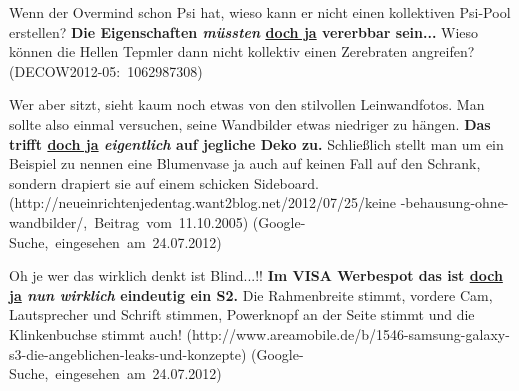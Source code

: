 \begin{exe}
	\ex\label{389}
	\scriptsize
	Wenn der Overmind schon Psi hat, wieso kann er nicht einen kollektiven Psi-Pool erstellen? \textbf{Die Eigenschaften \textit{müssten} \underline{doch 		ja} vererbbar sein...} Wieso können die Hellen Tepmler dann nicht kollektiv einen Zerebraten angreifen?                                               
	\hfill\hbox{(DECOW2012-05: 1062987308)}	
\end{exe}
	
\begin{exe}
	\ex\label{390}
	\scriptsize
	Wer aber sitzt, sieht kaum noch etwas von den stilvollen Leinwandfotos. Man sollte also einmal versuchen, seine Wandbilder etwas niedriger zu hängen. 		\textbf{Das trifft \underline{doch ja} \textit{eigentlich} auf jegliche Deko zu.} Schließlich stellt man um ein Beispiel zu nennen eine Blumenvase ja 		auch auf keinen Fall auf den Schrank, sondern drapiert sie auf einem schicken Sideboard. 
	\newline
	\hbox{}\hfill\hbox{(http://neueinrichtenjedentag.want2blog.net/2012/07/25/keine}	
	\newline
	\hbox{}\hfill\hbox{-behausung-ohne-wandbilder/, Beitrag vom 11.10.2005)}	
	\newline
	\hbox{}\hfill\hbox{(Google-Suche, eingesehen am 24.07.2012)}
\end{exe}	
	
\begin{exe}
	\ex\label{391}
	\scriptsize
	Oh je wer das wirklich denkt ist Blind...!!
	\textbf{Im VISA Werbespot das ist \underline{doch ja} \textit{nun wirklich} eindeutig ein S2.}
	Die Rahmenbreite stimmt, vordere Cam, Lautsprecher und Schrift stimmen, Powerknopf an der Seite stimmt und die Klinkenbuchse stimmt auch!
	\newline
	\hbox{}\hfill\hbox{(http://www.areamobile.de/b/1546-samsung-galaxy-}	
	\newline
	\hbox{}\hfill\hbox{s3-die-angeblichen-leaks-und-konzepte)}	
	\newline
	\hbox{}\hfill\hbox{(Google-Suche, eingesehen am 24.07.2012)}
\end{exe}						
							               	
